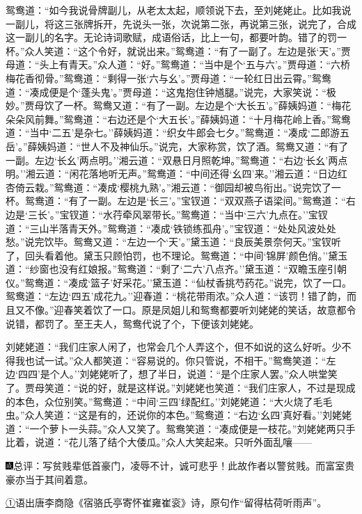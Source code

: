 鸳鸯道：``如今我说骨牌副儿，从老太太起，顺领说下去，至刘姥姥止。比如我说一副儿，将这三张牌拆开，先说头一张，次说第二张，再说第三张，说完了，合成这一副儿的名字。无论诗词歌赋，成语俗话，比上一句，都要叶韵。错了的罚一杯。''众人笑道：``这个令好，就说出来。''鸳鸯道：``有了一副了。左边是张`天'。''贾母道：``头上有青天。''众人道：``好。''鸳鸯道：``当中是个`五与六'。''贾母道：``六桥梅花香彻骨。''鸳鸯道：``剩得一张`六与幺'。''贾母道：``一轮红日出云霄。''鸳鸯道：``凑成便是个`蓬头鬼'。''贾母道：``这鬼抱住钟馗腿。''说完，大家笑说：``极妙。''贾母饮了一杯。鸳鸯又道：``有了一副。左边是个`大长五'。''薛姨妈道：``梅花朵朵风前舞。''鸳鸯道：``右边还是个`大五长'。''薛姨妈道：``十月梅花岭上香。''鸳鸯道：``当中`二五'是杂七。''薛姨妈道：``织女牛郎会七夕。''鸳鸯道：``凑成`二郎游五岳'。''薛姨妈道：``世人不及神仙乐。''说完，大家称赏，饮了酒。鸳鸯又道：``有了一副。左边`长幺'两点明。''湘云道：``双悬日月照乾坤。''鸳鸯道：``右边`长幺'两点明。''湘云道：``闲花落地听无声。''鸳鸯道：``中间还得`幺四'来。''湘云道：``日边红杏倚云栽。''鸳鸯道：``凑成`樱桃九熟'。''湘云道：``御园却被鸟衔出。''说完饮了一杯。鸳鸯道：``有了一副。左边是`长三'。''宝钗道：``双双燕子语梁间。''鸳鸯道：``右边是`三长'。''宝钗道：``水荇牵风翠带长。''鸳鸯道：``当中`三六'九点在。''宝钗道：``三山半落青天外。''鸳鸯道：``凑成`铁锁练孤舟'。''宝钗道：``处处风波处处愁。''说完饮毕。鸳鸯又道：``左边一个`天'。''黛玉道：``良辰美景奈何天。''宝钗听了，回头看着他。黛玉只顾怕罚，也不理论。鸳鸯道：``中间`锦屏'颜色俏。''黛玉道：``纱窗也没有红娘报。''鸳鸯道：``剩了`二六'八点齐。''黛玉道：``双瞻玉座引朝仪。''鸳鸯道：``凑成`篮子'好采花。''黛玉道：``仙杖香挑芍药花。''说完，饮了一口。鸳鸯道：``左边`四五'成花九。''迎春道：``桃花带雨浓。''众人道：``该罚！错了韵，而且又不像。''迎春笑着饮了一口。原是凤姐儿和鸳鸯都要听刘姥姥的笑话，故意都令说错，都罚了。至王夫人，鸳鸯代说了个，下便该刘姥姥。

刘姥姥道：``我们庄家人闲了，也常会几个人弄这个，但不如说的这么好听。少不得我也试一试。''众人都笑道：``容易说的。你只管说，不相干。''鸳鸯笑道：``左边`四四'是个人。''刘姥姥听了，想了半日，说道：``是个庄家人罢。''众人哄堂笑了。贾母笑道：``说的好，就是这样说。''刘姥姥也笑道：``我们庄家人，不过是现成的本色，众位别笑。''鸳鸯道：``中间`三四'绿配红。''刘姥姥道：``大火烧了毛毛虫。''众人笑道：``这是有的，还说你的本色。''鸳鸯道：``右边`幺四'真好看。''刘姥姥道：``一个萝卜一头蒜。''众人又笑了。鸳鸯笑道：``凑成便是一枝花。''刘姥姥两只手比着，说道：``花儿落了结个大倭瓜。''众人大笑起来。只听外面乱嚷------

{\includegraphics[width=3mm]{../Images/00005}总评：写贫贱辈低首豪门，凌辱不计，诚可悲乎！此故作者以警贫贱。而富室贵豪亦当于其间着意。}

{\href{../Text/part0044_split_000.html\#navto_1_a}{①}语出唐李商隐《宿骆氏亭寄怀崔雍崔衮》诗，原句作``留得枯荷听雨声''。}
